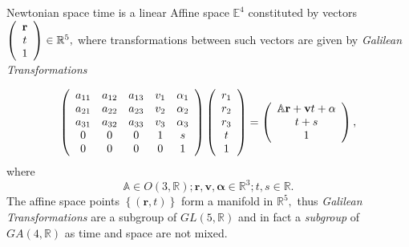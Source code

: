 \documentclass[aps,preprint]{revtex4}%
\begin{document}
Newtonian space time is a linear Affine space $\mathbb{E}^{4}$ constituted by
vectors $\left(
\begin{array}
[c]{c}%
\mathbf{r}\\
t\\
1
\end{array}
\right)  \in\mathbb{R}^{5},$ where transformations between such vectors are
given by \emph{Galilean Transformations}%

\begin{equation}
\left(
\begin{array}
[c]{ccccc}%
a_{11} & a_{12} & a_{13} & v_{1} & \alpha_{1}\\
a_{21} & a_{22} & a_{23} & v_{2} & \alpha_{2}\\
a_{31} & a_{32} & a_{33} & v_{3} & \alpha_{3}\\
0 & 0 & 0 & 1 & s\\
0 & 0 & 0 & 0 & 1
\end{array}
\right)  \left(
\begin{array}
[c]{c}%
r_{1}\\
r_{2}\\
r_{3}\\
t\\
1
\end{array}
\right)  =\left(
\begin{array}
[c]{c}%
\mathbb{A}\mathbf{r}+\mathbf{v}t+\mathbf{\alpha}\\
t+s\\
1
\end{array}
\right)  ,
\end{equation}
where
\begin{equation}
\mathbb{A}\in O\left(  3,\mathbb{R}\right)  ;\mathbf{r,v},\mathbf{\alpha}%
\in\mathbb{R}^{3};t,s\in\mathbb{R}.
\end{equation}
The affine space points $\left\{  \left(  \mathbf{r,}t\right)  \right\}  $
form a manifold in $\mathbb{R}^{5},$ thus \emph{Galilean Transformations }are
a subgroup of $GL\left(  5,\mathbb{R}\right)  $ and in fact a \emph{subgroup}
of $GA\left(  4,\mathbb{R}\right)  $ as time and space are not mixed.
\end{document}
